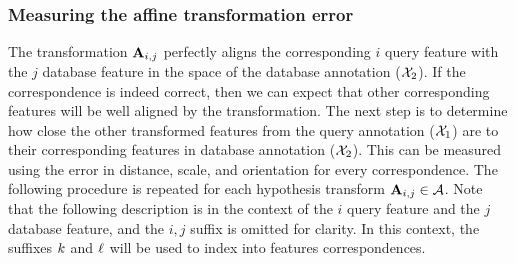         \subsubsection{Measuring the affine transformation error}
            The transformation $\mathbf{A}_{i, j}$ perfectly aligns the
              corresponding $i$\th{} query feature with the $j$\th{}
              database feature in the space of the database annotation
              ($\mathcal{X}_{2}$).
            If the correspondence is indeed correct, then we can expect
              that other corresponding features will be well aligned by
              the transformation.
            The next step is to determine how close the other
              transformed features from the query annotation ($\mathcal{X}_{1}$)
              are to their corresponding features in database annotation
              ($\mathcal{X}_{2}$).
            This can be measured using the error in distance, scale,
              and orientation for every correspondence.
            The following procedure is repeated for each hypothesis
              transform %
            $\mathbf{A}_{i, j} \in \mathcal{A}$.
            Note that the following description is in the context of
              the $i$\th{} query feature and the $j$\th{} database
              feature, and the $i,j$ suffix is omitted for clarity.
            In this context, the suffixes $k$ and $\ell$ will be
              used to index into features correspondences.

